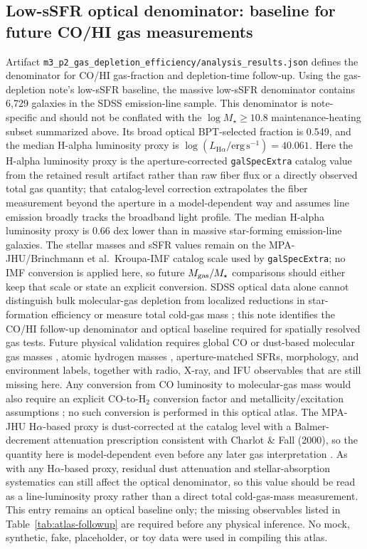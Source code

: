 \documentclass[twocolumn]{aastex631}
\begin{document}
\subsection{Low-sSFR optical denominator: baseline for future CO/HI gas measurements}
Artifact \texttt{m3\_p2\_gas\_depletion\_efficiency/analysis\_results.json} defines the denominator for CO/HI gas-fraction and depletion-time follow-up. Using the gas-depletion note's low-sSFR baseline, the massive low-sSFR denominator contains 6,729 galaxies in the SDSS emission-line sample. This denominator is note-specific and should not be conflated with the \(\log M_\star \geq 10.8\) maintenance-heating subset summarized above. Its broad optical BPT-selected fraction is 0.549, and the median H-alpha luminosity proxy is \(\log (L_{\mathrm{H}\alpha}/\mathrm{erg\,s^{-1}}) = 40.061\). Here the H-alpha luminosity proxy is the aperture-corrected \texttt{galSpecExtra} catalog value from the retained result artifact rather than raw fiber flux or a directly observed total gas quantity; that catalog-level correction extrapolates the fiber measurement beyond the aperture in a model-dependent way and assumes line emission broadly tracks the broadband light profile. The median H-alpha luminosity proxy is 0.66 dex lower than in massive star-forming emission-line galaxies. The stellar masses and sSFR values remain on the MPA-JHU/Brinchmann et al.\ Kroupa-IMF catalog scale used by \texttt{galSpecExtra}; no IMF conversion is applied here, so future \(M_{\rm gas}/M_\star\) comparisons should either keep that scale or state an explicit conversion. SDSS optical data alone cannot distinguish bulk molecular-gas depletion from localized reductions in star-formation efficiency or measure total cold-gas mass \citep{tacconi2018}; this note identifies the CO/HI follow-up denominator and optical baseline required for spatially resolved gas tests. Future physical validation requires global CO or dust-based molecular gas masses \citep[e.g., xCOLD GASS;][]{xcoldgass2017}, atomic hydrogen masses \citep[e.g., xGASS;][]{xgass2018}, aperture-matched SFRs, morphology, and environment labels, together with radio, X-ray, and IFU observables that are still missing here. Any conversion from CO luminosity to molecular-gas mass would also require an explicit CO-to-H$_2$ conversion factor and metallicity/excitation assumptions \citep{bolatto2013}; no such conversion is performed in this optical atlas. The MPA-JHU H$\alpha$-based proxy is dust-corrected at the catalog level with a Balmer-decrement attenuation prescription consistent with Charlot \& Fall (2000), so the quantity here is model-dependent even before any later gas interpretation \citep{charlotfall2000}. As with any H$\alpha$-based proxy, residual dust attenuation and stellar-absorption systematics can still affect the optical denominator, so this value should be read as a line-luminosity proxy rather than a direct total cold-gas-mass measurement. This entry remains an optical baseline only; the missing observables listed in Table~\ref{tab:atlas-followup} are required before any physical inference. No mock, synthetic, fake, placeholder, or toy data were used in compiling this atlas.
\end{document}
